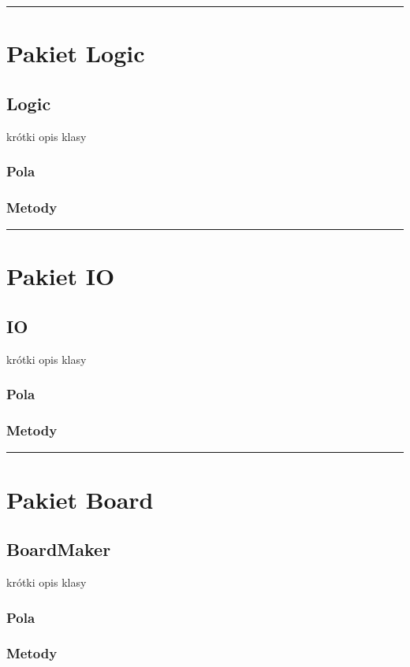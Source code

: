 \documentclass[a4paper,11pt]{article}
\newcommand{\linia}{\rule{\linewidth}{0.4mm}}
\begin{document}
\noindent\linia
\section{Pakiet Logic}

\subsection{Logic}
krótki opis klasy
\subsubsection{Pola}

\subsubsection{Metody}



\noindent\linia
\section{Pakiet IO}
\subsection{IO}
krótki opis klasy
\subsubsection{Pola}

\subsubsection{Metody}



\noindent\linia

\section{Pakiet Board}

\subsection{BoardMaker}
krótki opis klasy
\subsubsection{Pola}

\subsubsection{Metody}
\end{document}

